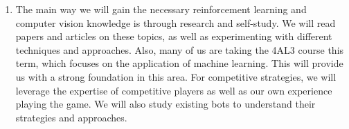 \documentclass{article}
\begin{document}
\begin{enumerate}
    \item The main way we will gain the necessary reinforcement learning and computer vision
    knowledge is through research and self-study. We will read papers and articles on these topics,
    as well as experimenting with different techniques and approaches. Also, many of us are taking
    the 4AL3 course this term, which focuses on the application of machine learning.
    This will provide us with a strong foundation in this area. For competitive \emph{\Catan{}} strategies, we will leverage the expertise of
    competitive players as well as our own experience playing the game. We will also study existing \emph{\Catan{}} bots
    to understand their strategies and approaches.

\end{enumerate}
\end{document}
